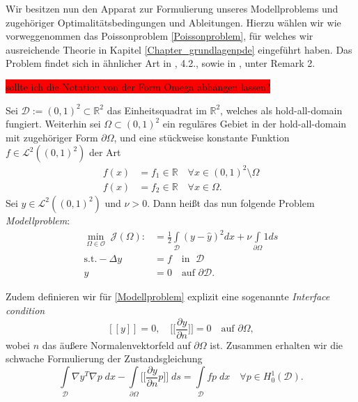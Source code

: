 Wir besitzen nun den Apparat zur Formulierung unseres Modellproblems und zugehöriger Optimalitätsbedingungen und Ableitungen. Hierzu wählen wir wie vorweggenommen das Poissonproblem \ref{Poissonproblem}, für welches wir ausreichende Theorie in Kapitel \ref{Chapter_grundlagenpde} eingeführt haben. Das Problem findet sich in ähnlicher Art in \cite{shape_space}, 4.2., sowie in \cite{LagrangeNewton}, unter Remark 2.

\colorbox{red}{sollte ich die Notation von der Form Omega abhängen lassen?}
\begin{defi}[Modellproblem]
	Sei $\mathcal{D} := (0,1)^2 \subset \mathbb{R}^2$ das Einheitsquadrat im $\mathbb{R}^2$, welches als hold-all-domain fungiert.
	Weiterhin sei $\Omega \subset (0,1)^2$ ein reguläres Gebiet in der hold-all-domain mit zugehöriger Form $\partial\Omega$, und eine stückweise konstante Funktion $f \in \mathcal{L}^2((0,1)^2)$ der Art
	\begin{align*}
		f(x) &= f_1 \in \mathbb{R} \quad \forall x \in (0,1)^2\setminus \Omega \\
		f(x) &= f_2 \in \mathbb{R} \quad \forall x \in \Omega.
	\end{align*}
	Sei $\hat{y} \in \mathcal{L}^2((0,1)^2)$ und $\nu > 0$. Dann heißt das nun folgende Problem \textit{Modellproblem}:
	\begin{equation}\label{Modellproblem}
	\begin{aligned}
	\underset{\Omega\in \mathcal{O}}{\min}\; \mathcal{J}(\Omega) :&= \frac{1}{2}\underset{\mathcal{D}}{\int} (y - \hat{y})^2 dx + \nu\underset{\partial\Omega}{\int} 1 ds \\
	\text{s.t.} -\Delta y &= f \quad \text{in } \;\mathcal{D} \\
	y &= 0  \quad \text{auf } \partial\mathcal{D}.
	\end{aligned}
	\end{equation}		
	
	Zudem definieren wir für \ref{Modellproblem} explizit eine sogenannte \textit{Interface condition}
	\begin{equation}\label{Interfacecondition}
		[[y]] = 0, \quad \Big[\Big[\frac{\partial y}{\partial n}\Big]\Big] = 0 \quad \text{auf } \partial \Omega,
	\end{equation}
	wobei $n$ das äußere Normalenvektorfeld auf $\partial\Omega$ ist.	Zusammen erhalten wir die schwache Formulierung der Zustandsgleichung
	\begin{equation}
		\underset{\mathcal{D}}{\int} \nabla y^T \nabla p\; dx - \underset{\partial\Omega}{\int} \Big[\Big[ \frac{\partial y}{\partial n}p\Big]\Big]\;ds = \underset{\mathcal{D}}{\int} fp \;dx \quad \forall p \in H^1_0(\mathcal{D}).
	\end{equation}
	

\end{defi}
